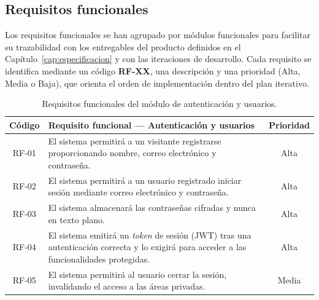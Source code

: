 \subsection{Requisitos funcionales}
\label{sec:requisitos-funcionales}

Los requisitos funcionales se han agrupado por módulos funcionales para facilitar su trazabilidad con los entregables del producto definidos en el Capítulo~\ref{cap:especificacion} y con las iteraciones de desarrollo. Cada requisito se identifica mediante un código \textbf{RF-XX}, una descripción y una prioridad (Alta, Media o Baja), que orienta el orden de implementación dentro del plan iterativo.

\begin{table}[h!]
\centering
\small
\begin{tabular}{|c|p{10.5cm}|c|}
\hline
\textbf{Código} & \textbf{Requisito funcional --- Autenticación y usuarios} & \textbf{Prioridad} \\ \hline
RF-01 & El sistema permitirá a un visitante registrarse proporcionando nombre, correo electrónico y contraseña. & Alta \\ \hline
RF-02 & El sistema permitirá a un usuario registrado iniciar sesión mediante correo electrónico y contraseña. & Alta \\ \hline
RF-03 & El sistema almacenará las contraseñas cifradas y nunca en texto plano. & Alta \\ \hline
RF-04 & El sistema emitirá un \textit{token} de sesión (JWT) tras una autenticación correcta y lo exigirá para acceder a las funcionalidades protegidas. & Alta \\ \hline
RF-05 & El sistema permitirá al usuario cerrar la sesión, invalidando el acceso a las áreas privadas. & Media \\ \hline
\end{tabular}
\caption{Requisitos funcionales del módulo de autenticación y usuarios.}
\label{tab:rf-auth}
\end{table}

